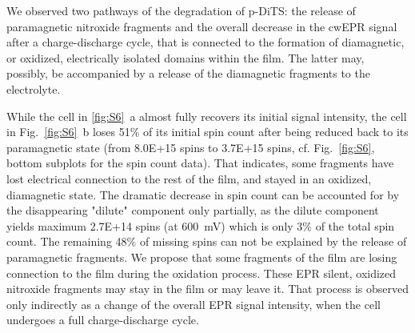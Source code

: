 \bigbreak

We observed two pathways of the degradation of p-DiTS: the release of paramagnetic nitroxide fragments and the overall decrease in the cwEPR signal after a charge-discharge cycle, that is connected to the formation of diamagnetic, or oxidized, electrically isolated domains within the film. The latter may, possibly, be accompanied by a release of the diamagnetic fragments to the electrolyte.

\bigbreak

While the cell in \ref{fig:S6}~a almost fully recovers its initial signal intensity, the cell in Fig.~\ref{fig:S6}~b loses 51$\%$ of its initial spin count after being reduced back to its paramagnetic state (from 8.0E+15 spins to 3.7E+15 spins, cf. Fig.~\ref{fig:S6}, bottom subplots for the spin count data). That indicates, some fragments have lost electrical connection to the rest of the film, and stayed in an oxidized, diamagnetic state. The dramatic decrease in spin count can be accounted for by the disappearing "dilute" component only partially, as the dilute component yields maximum 2.7E+14 spins (at 600~mV) which is only 3$\%$ of the total spin count. The remaining 48$\%$ of missing spins can not be explained by the release of paramagnetic fragments. We propose that some fragments of the film are losing connection to the film during the oxidation process. These EPR silent, oxidized nitroxide fragments may stay in the film or may leave it. That process is observed only indirectly as a change of the overall EPR signal intensity, when the cell undergoes a full charge-discharge cycle.



